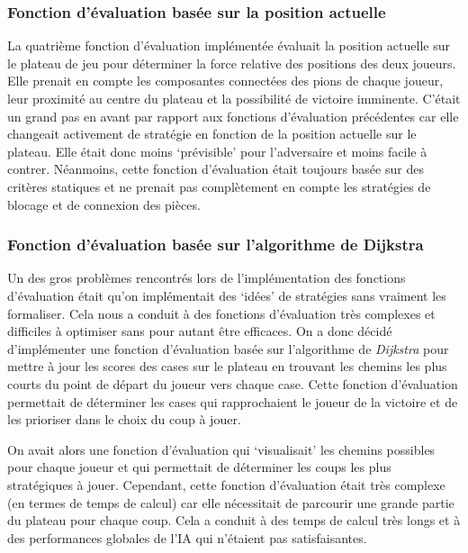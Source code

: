\subsubsection{Fonction d'évaluation basée sur la position actuelle}
La quatrième fonction d'évaluation implémentée évaluait la position actuelle sur le plateau de jeu pour déterminer
la force relative des positions des deux joueurs. Elle prenait en compte les composantes connectées des pions de chaque joueur,
leur proximité au centre du plateau et la possibilité de victoire imminente.
C'était un grand pas en avant par rapport aux fonctions d'évaluation précédentes car elle changeait activement
de stratégie en fonction de la position actuelle sur le plateau. Elle était donc moins `prévisible' pour l'adversaire et 
moins facile à contrer.
Néanmoins, cette fonction d'évaluation était toujours basée sur des critères statiques et ne prenait pas complètement
en compte les stratégies de blocage et de connexion des pièces.

\subsubsection{Fonction d'évaluation basée sur l'algorithme de Dijkstra}
Un des gros problèmes rencontrés lors de l'implémentation des fonctions d'évaluation était qu'on implémentait
des `idées' de stratégies sans vraiment les formaliser. Cela nous a conduit à des fonctions d'évaluation très complexes
et difficiles à optimiser sans pour autant être efficaces.
On a donc décidé d'implémenter une fonction d'évaluation basée sur l'algorithme de \emph{Dijkstra} pour mettre à jour
les scores des cases sur le plateau en trouvant les chemins les plus courts du point de départ du joueur vers chaque case.
Cette fonction d'évaluation permettait de déterminer les cases qui rapprochaient le joueur de la victoire et de les
prioriser dans le choix du coup à jouer.

On avait alors une fonction d'évaluation qui `visualisait' les chemins possibles pour chaque joueur et qui permettait
de déterminer les coups les plus stratégiques à jouer. 
Cependant, cette fonction d'évaluation était très complexe (en termes de temps de calcul) car elle nécessitait de parcourir
une grande partie du plateau pour chaque coup. Cela a conduit à des temps de calcul très longs et à des performances
globales de l'IA qui n'étaient pas satisfaisantes.


